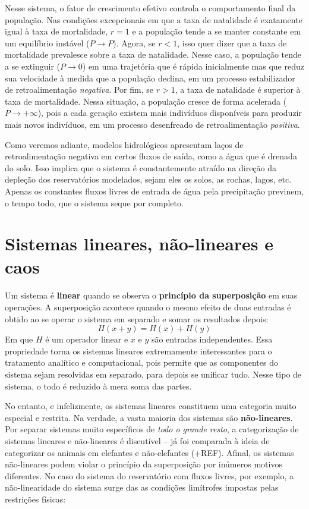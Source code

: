 \documentclass[./main.tex]{subfiles}
\begin{document}
\par Nesse sistema, o fator de crescimento efetivo controla o comportamento final da população. Nas condições excepcionais em que a taxa de natalidade é exatamente igual à taxa de mortalidade, $r = 1$ e a população tende a se manter constante em um equilíbrio instável ($P \to P$). Agora, se $r < 1$, isso quer dizer que a taxa de mortalidade prevalesce sobre a taxa de natalidade. Nesse caso, a população tende a se extinguir ($P \to 0$) em uma trajetória que é rápida inicialmente mas que reduz sua velocidade à medida que a população declina, em um processo estabilizador de retroalimentação \textit{negativa}. Por fim, se $r > 1$, a taxa de natalidade é superior à taxa de mortalidade. Nessa situação, a população cresce de forma acelerada ($P \to +\infty$), pois a cada geração existem mais indivíduos disponíveis para produzir mais novos indivíduos, em um processo desenfreado de retroalimentação \textit{positiva}.	  

\par Como veremos adiante, modelos hidrológicos apresentam laços de retroalimentação negativa em certos fluxos de saída, como a água que é drenada do solo. Isso implica que o sistema é constantemente atraído na direção da depleção dos reservatórios modelados, sejam eles os solos, as rochas, lagos, etc. Apenas os constantes fluxos livres de entrada de água pela precipitação previnem, o tempo todo, que o sistema seque por completo.

\section{Sistemas lineares, não-lineares e caos}

\par Um sistema é \textbf{linear} quando se observa o \textbf{princípio da superposição} em suas operações. A superposição acontece quando o mesmo efeito de duas entradas é obtido ao se operar o sistema em separado e somar os resultados depois:
\[H(x + y) = H(x) + H(y)\]
Em que $H$ é um operador linear e $x$ e $y$ são entradas independentes. Essa propriedade torna os sistemas lineares extremamente interessantes para o tratamento analítico e computacional, pois permite que as componentes do sistema sejam resolvidas em separado, para depois se unificar tudo. Nesse tipo de sistema, o todo é reduzido à mera soma das partes.

\par No entanto, e infelizmente, os sistemas lineares constituem uma categoria muito especial e restrita. Na verdade, a vasta maioria dos sistemas são \textbf{não-lineares}. Por separar sistemas muito específicos de \textit{todo o grande resto}, a categorização de sistemas lineares e não-lineares é discutível -- já foi comparada à ideia de categorizar os animais em elefantes e não-elefantes (+REF). Afinal, os sistemas não-lineares podem violar o princípio da superposição por inúmeros motivos diferentes. No caso do sistema do reservatório com fluxos livres, por exemplo, a não-linearidade do sistema surge das as condições limítrofes impostas pelas restrições físicas:   
\end{document}
